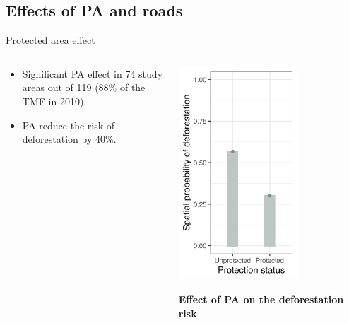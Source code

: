\documentclass[10pt,table,dvipsnames,compress]{beamer}
\begin{document}
\subsection{Effects of PA and roads}
\label{sec:org33fbdc8}
\begin{frame}[label={sec:orgb3d2659}]{Protected area effect}
\begin{columns}
\begin{column}{0.5\columnwidth}
\begin{itemize}
\item Significant PA effect in 74 study areas out of 119 (88\% of the TMF in
2010).
\item PA reduce the risk of deforestation by 40\%.
\end{itemize}
\end{column}

\begin{column}{0.5\columnwidth}
\centering \includegraphics[width=0.65\textwidth]{figs/article/proba-PA}

\textbf{Effect of PA on the deforestation risk}
\end{column}
\end{columns}
\end{frame}
\end{document}

